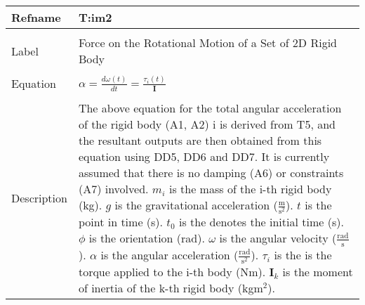 \documentclass[12pt]{article}
\begin{document}
\noindent \begin{minipage}{\textwidth}
\begin{tabular}{p{} p{}}
\toprule \textbf{Refname} & \textbf{T:im2}
\label{T:im2}
\\ \midrule \\
Label & Force on the Rotational Motion of a Set of 2D Rigid Body
\\ \midrule \\
Equation & $\alpha{}=\frac{d \omega{}\left(t\right)}{d t}=\frac{{\tau{}_{i}}\left(t\right)}{\mathbf{I}}$
\\ \midrule \\
Description & The above equation for the total angular acceleration of the rigid body (A1, A2) i is derived from T5, and the resultant outputs are then obtained from this equation using DD5, DD6 and DD7. It is currently assumed that there is no damping (A6) or constraints (A7) involved. ${m_{i}}$ is the mass of the i-th rigid body (kg). $g$ is the gravitational acceleration ($\frac{\text{m}}{\text{s}^{2}}$). $t$ is the point in time (s). ${t_{0}}$ is the denotes the initial time (s). $\phi{}$ is the orientation (rad). $\omega{}$ is the angular velocity ($\frac{\text{rad}}{\text{s}}$). $\alpha{}$ is the angular acceleration ($\frac{\text{rad}}{\text{s}^{2}}$). ${\tau{}_{i}}$ is the is the torque applied to the i-th body (Nm). ${\mathbf{I}_{k}}$ is the moment of inertia of the k-th rigid body (kg$\text{m}^{2}$).
\\ \bottomrule \end{tabular}
\end{minipage}\\
~\newline
\end{document}
